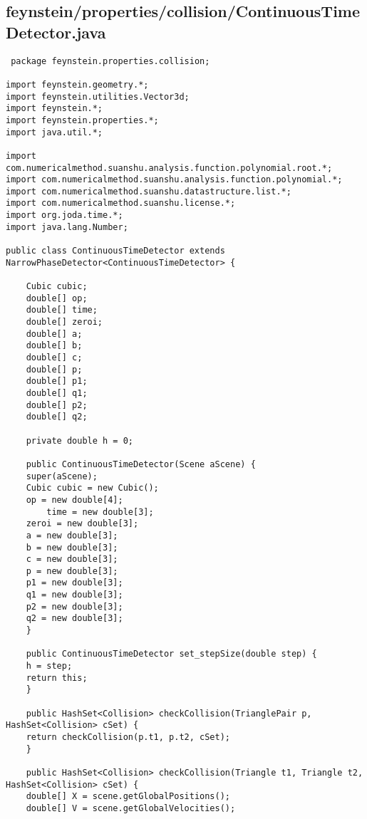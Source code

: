 \subsection*{feynstein/properties/collision/ContinuousTimeDetector.java}
\begin{lstlisting}
 package feynstein.properties.collision;

import feynstein.geometry.*;
import feynstein.utilities.Vector3d;
import feynstein.*;
import feynstein.properties.*;
import java.util.*;

import com.numericalmethod.suanshu.analysis.function.polynomial.root.*;
import com.numericalmethod.suanshu.analysis.function.polynomial.*;
import com.numericalmethod.suanshu.datastructure.list.*;
import com.numericalmethod.suanshu.license.*;
import org.joda.time.*;
import java.lang.Number;

public class ContinuousTimeDetector extends NarrowPhaseDetector<ContinuousTimeDetector> {

    Cubic cubic;
    double[] op;
    double[] time;
    double[] zeroi;
    double[] a;
    double[] b;
    double[] c;
    double[] p;
    double[] p1;
    double[] q1;
    double[] p2;
    double[] q2;

    private double h = 0;      

    public ContinuousTimeDetector(Scene aScene) {
	super(aScene);
	Cubic cubic = new Cubic();
	op = new double[4];
        time = new double[3];
	zeroi = new double[3];
	a = new double[3];
	b = new double[3];
	c = new double[3];
	p = new double[3];
	p1 = new double[3];
	q1 = new double[3];
	p2 = new double[3];
	q2 = new double[3];
    }

    public ContinuousTimeDetector set_stepSize(double step) {
	h = step;
	return this;
    }
    
    public HashSet<Collision> checkCollision(TrianglePair p, HashSet<Collision> cSet) {
	return checkCollision(p.t1, p.t2, cSet);
    }

    public HashSet<Collision> checkCollision(Triangle t1, Triangle t2, HashSet<Collision> cSet) {
	double[] X = scene.getGlobalPositions();
	double[] V = scene.getGlobalVelocities();


\end{lstlisting}
